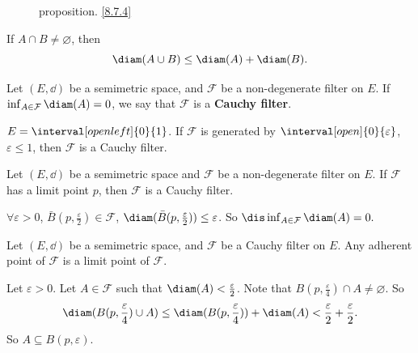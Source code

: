 \begin{proofenv}
\begin{figure}[H]
\caption{proposition. \ref{8.7.4}}
    \end{figure}
\end{proofenv}
\begin{corollaryenv}
    If $A\cap B\neq\varnothing$, then 
    $$\diam(A\cup B)\le \diam(A)+\diam(B).$$
\end{corollaryenv}
\begin{definitionenv}
    Let $(E,\dd)$ be a semimetric space, and $\mathcal{F}$ be a non-degenerate filter on $E$. If $\inf_{A\in \mathcal{F}}\diam(A)=0$, we say that $\mathcal{F}$ is a \textbf{Cauchy filter}.
\end{definitionenv}
\begin{exampleenv}
    $E=\interval[open left]{0}{1}$. If $\mathcal{F}$ is generated by $\interval[open]{0}{\varepsilon}$, $\varepsilon\le 1$, then $\mathcal{F}$ is a Cauchy filter.
\end{exampleenv}
\begin{propositionenv}
    Let $(E,\dd)$ be a semimetric space and $\mathcal{F}$ be a non-degenerate filter on $E$. If $\mathcal{F}$ has a limit point $p$, then $\mathcal{F}$ is a Cauchy filter.
\end{propositionenv}
\begin{proofenv}
    $\forall \varepsilon>0$, $\bar{B}(p,\frac{\varepsilon}{2})\in \mathcal{F}$, $\diam(\bar{B}(p,\frac{\varepsilon}{2}))\le \varepsilon$. So $\dis \inf_{A\in \mathcal{F}}\diam(A)=0.$
\end{proofenv}
\begin{propositionenv}
    Let $(E,\dd)$ be a semimetric space, and $\mathcal{F}$ be a Cauchy filter on $E$. Any adherent point of $\mathcal{F}$ is a limit point of $\mathcal{F}$.
\end{propositionenv}
\begin{proofenv}
    Let $\varepsilon>0$. Let $A\in \mathcal{F}$ such that $\diam(A)<\frac{\varepsilon}{2}$. Note that $B(p,\frac{\varepsilon}{4})\cap A\neq\varnothing$. So 
    $$\diam(B(p,\frac{\varepsilon}{4})\cup A)\le \diam(B(p,\frac{\varepsilon}{4}))+\diam(A)<\frac{\varepsilon}{2}+\frac{\varepsilon}{2}.$$
    So $A\subseteq B(p,\varepsilon)$.
\end{proofenv}
